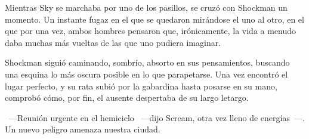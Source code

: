 Mientras Sky se marchaba por uno de los pasillos, se cruzó con Shockman un momento. Un instante fugaz en el que se quedaron mirándose el uno al otro, en el que por una vez, ambos hombres pensaron que, irónicamente, la vida a menudo daba muchas más vueltas de las que uno pudiera imaginar.

Shockman siguió caminando, sombrío, absorto en sus pensamientos, buscando una esquina lo más oscura posible en lo que parapetarse. Una vez encontró el lugar perfecto, y su rata subió por la gabardina hasta posarse en su mano, comprobó cómo, por fin, el ausente despertaba de su largo letargo.

~---Reunión urgente en el hemiciclo ~---dijo Scream, otra vez lleno de energías~---. Un nuevo peligro amenaza nuestra ciudad.

\endinput
